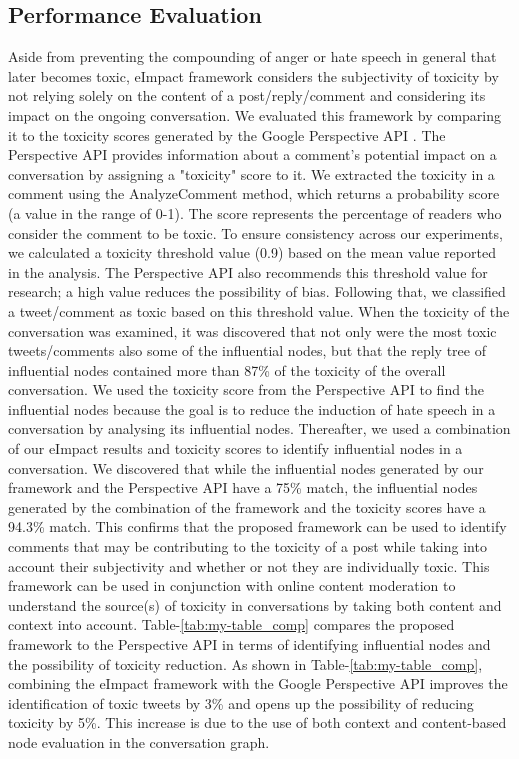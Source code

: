 \documentclass[acmtog]{acmart}
\begin{document}
\subsection{Performance Evaluation}
Aside from preventing the compounding of anger or hate speech in general that later becomes toxic, eImpact framework considers the subjectivity of toxicity by not relying solely on the content of a post/reply/comment and considering its impact on the ongoing conversation. We evaluated this framework by comparing it to the toxicity scores generated by the Google Perspective API \cite{bworld}. The Perspective API provides information about a comment's potential impact on a conversation by assigning a "toxicity" score to it. We extracted the toxicity in a comment using the AnalyzeComment \cite{bworld} method, which returns a probability score (a value in the range of 0-1). The score represents the percentage of readers who consider the comment to be toxic. To ensure consistency across our experiments, we calculated a toxicity threshold value (0.9) based on the mean value reported in the analysis. The Perspective API \cite{bworld} also recommends this threshold value for research; a high value reduces the possibility of bias. Following that, we classified a tweet/comment as toxic based on this threshold value. When the toxicity of the conversation was examined, it was discovered that not only were the most toxic tweets/comments also some of the influential nodes, but that the reply tree of influential nodes contained more than 87\% of the toxicity of the overall conversation. We used the toxicity score from the Perspective API \cite{bworld} to find the influential nodes because the goal is to reduce the induction of hate speech in a conversation by analysing its influential nodes. Thereafter, we used a combination of our eImpact results and toxicity scores to identify influential nodes in a conversation. We discovered that while the influential nodes generated by our framework and the Perspective API have a 75\% match, the influential nodes generated by the combination of the framework and the toxicity scores have a 94.3\% match. This confirms that the proposed framework can be used to identify comments that may be contributing to the toxicity of a post while taking into account their subjectivity and whether or not they are individually toxic. This framework can be used in conjunction with online content moderation to understand the source(s) of toxicity in conversations by taking both content and context into account. Table-\ref{tab:my-table_comp} compares the proposed framework to the Perspective API in terms of identifying influential nodes and the possibility of toxicity reduction. As shown in Table-\ref{tab:my-table_comp}, combining the eImpact framework with the Google Perspective API improves the identification of toxic tweets by 3\% and opens up the possibility of reducing toxicity by 5\%. This increase is due to the use of both context and content-based node evaluation in the conversation graph.
\end{document}

